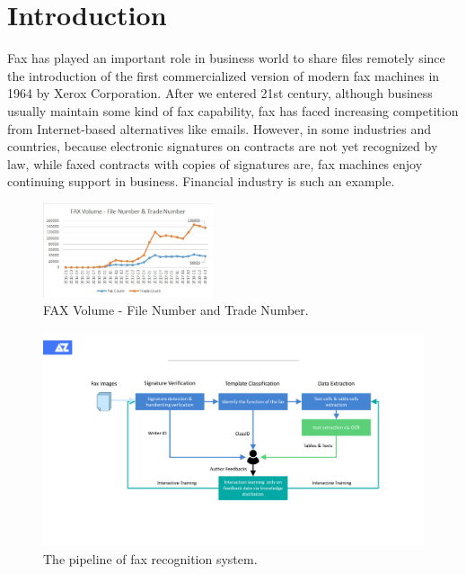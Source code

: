 \documentclass[sigconf]{acmart}
\begin{document}
\section{Introduction}
Fax has played an important role in business world to share files remotely since the introduction of the first commercialized version of modern fax machines in 1964 by Xerox Corporation. After we entered 21st century, although business usually maintain some kind of fax capability, fax has faced increasing competition from Internet-based alternatives like emails. However, in some industries and countries, because electronic signatures on contracts are not yet recognized by law, while faxed contracts with copies of signatures are, fax machines enjoy continuing support in business. Financial industry is such an example.

\begin{figure}[h]
	\centering
	\includegraphics[width=5cm]{figure1.jpg}
	\caption{FAX Volume - File Number and Trade Number. }
	\label{figure1}
\end{figure}

\begin{figure}[h]
	\centering
	\includegraphics[width=\linewidth]{figure2}
	\caption{The pipeline of fax recognition system. }
	\label{figure2}
\end{figure}
\end{document}
